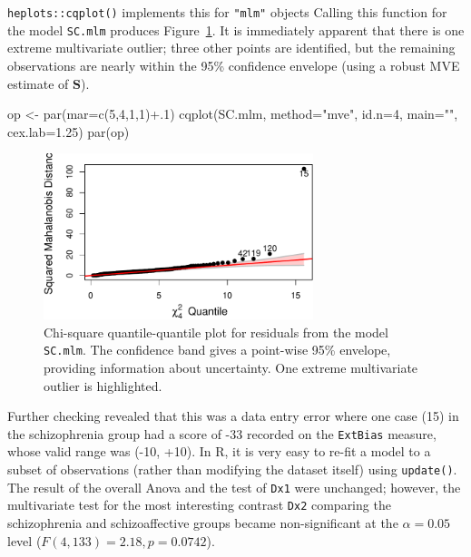 \documentclass[
  letterpaper,
  10pt,
  krantz2]{krantz}
\makeatletter
\newenvironment{Shaded}{\begin{snugshade}}{\end{snugshade}}
\newcommand{\AttributeTok}[1]{\textcolor[rgb]{0.40,0.45,0.13}{#1}}
\newcommand{\DecValTok}[1]{\textcolor[rgb]{0.68,0.00,0.00}{#1}}
\newcommand{\FloatTok}[1]{\textcolor[rgb]{0.68,0.00,0.00}{#1}}
\newcommand{\FunctionTok}[1]{\textcolor[rgb]{0.28,0.35,0.67}{#1}}
\newcommand{\NormalTok}[1]{\textcolor[rgb]{0.00,0.23,0.31}{#1}}
\newcommand{\OtherTok}[1]{\textcolor[rgb]{0.00,0.23,0.31}{#1}}
\newcommand{\SpecialCharTok}[1]{\textcolor[rgb]{0.37,0.37,0.37}{#1}}
\newcommand{\StringTok}[1]{\textcolor[rgb]{0.13,0.47,0.30}{#1}}
\newenvironment{kframe}{%
  \medskip{}
  \setlength{\fboxsep}{.8em}
  \def\at@end@of@kframe{}%
  \ifinner\ifhmode%
  \def\at@end@of@kframe{\end{minipage}}%
  \begin{minipage}{\columnwidth}%
  \fi\fi%
  \def\FrameCommand##1{\hskip\@totalleftmargin \hskip-\fboxsep
  \colorbox{shadecolor}{##1}\hskip-\fboxsep
      \hskip-\linewidth \hskip-\@totalleftmargin \hskip\columnwidth}%
  \MakeFramed {\advance\hsize-\width
    \@totalleftmargin\z@ \linewidth\hsize
    \@setminipage}}%
{\par\unskip\endMakeFramed%
  \at@end@of@kframe}
\renewenvironment{Shaded}{\begin{kframe}}{\end{kframe}}
\makeatother
\begin{document}
\texttt{heplots::cqplot()} implements this for \texttt{"mlm"} objects
Calling this function for the model \texttt{SC.mlm} produces
Figure~\ref{fig-SC-cqplot}. It is immediately apparent that there is one
extreme multivariate outlier; three other points are identified, but the
remaining observations are nearly within the 95\% confidence envelope
(using a robust MVE estimate of \(\mathbf{S}\)).

\begin{Shaded}
\begin{Highlighting}[]
\NormalTok{op }\OtherTok{\textless{}{-}} \FunctionTok{par}\NormalTok{(}\AttributeTok{mar=}\FunctionTok{c}\NormalTok{(}\DecValTok{5}\NormalTok{,}\DecValTok{4}\NormalTok{,}\DecValTok{1}\NormalTok{,}\DecValTok{1}\NormalTok{)}\SpecialCharTok{+}\NormalTok{.}\DecValTok{1}\NormalTok{)}
\FunctionTok{cqplot}\NormalTok{(SC.mlm, }\AttributeTok{method=}\StringTok{"mve"}\NormalTok{, }
       \AttributeTok{id.n=}\DecValTok{4}\NormalTok{, }
       \AttributeTok{main=}\StringTok{""}\NormalTok{, }
       \AttributeTok{cex.lab=}\FloatTok{1.25}\NormalTok{)}
\FunctionTok{par}\NormalTok{(op)}
\end{Highlighting}
\end{Shaded}

\begin{figure}[H]

{\centering \includegraphics[width=0.7\textwidth,height=\textheight]{figs/fig-SC-cqplot-1.pdf}

}

\caption{\label{fig-SC-cqplot}Chi-square quantile-quantile plot for
residuals from the model \texttt{SC.mlm}. The confidence band gives a
point-wise 95\% envelope, providing information about uncertainty. One
extreme multivariate outlier is highlighted.}

\end{figure}

Further checking revealed that this was a data entry error where one
case (15) in the schizophrenia group had a score of -33 recorded on the
\texttt{ExtBias} measure, whose valid range was (-10, +10). In R, it is
very easy to re-fit a model to a subset of observations (rather than
modifying the dataset itself) using \texttt{update()}. The result of the
overall Anova and the test of \texttt{Dx1} were unchanged; however, the
multivariate test for the most interesting contrast \texttt{Dx2}
comparing the schizophrenia and schizoaffective groups became
non-significant at the \(\alpha=0.05\) level
(\(F(4, 133)=2.18, p = 0.0742\)).
\end{document}
